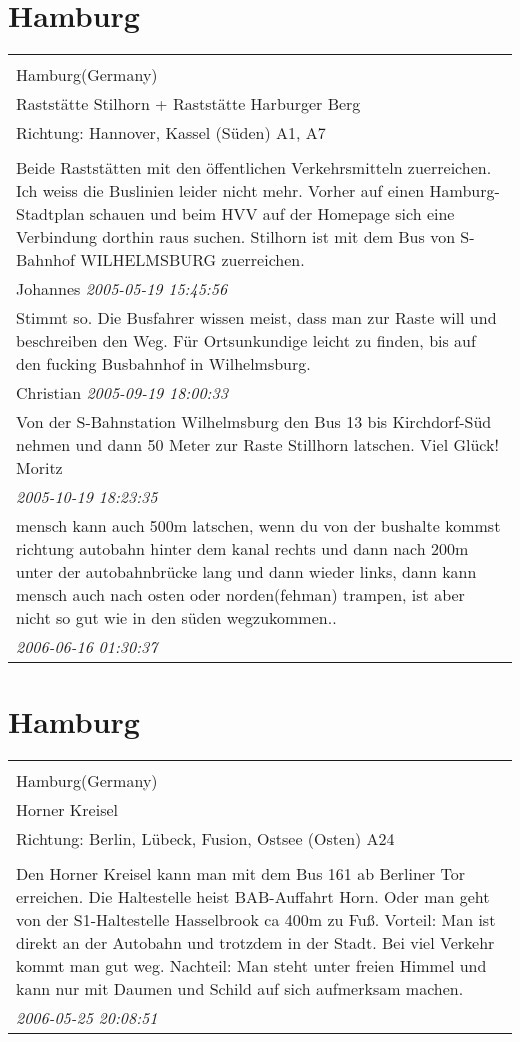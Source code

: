 \documentclass[a4paper,12pt]{article}
\begin{document}
\section{Hamburg}
\begin{tabular}{|p{13cm}|}
\hline\\
Hamburg(Germany)\\
Raststätte Stilhorn + Raststätte Harburger Berg\\
Richtung: Hannover, Kassel (Süden) A1, A7 \\
\hline\\
Beide Raststätten mit den öffentlichen Verkehrsmitteln zuerreichen. Ich weiss die Buslinien leider nicht mehr. Vorher auf einen Hamburg-Stadtplan schauen und beim HVV auf der Homepage sich eine Verbindung dorthin raus suchen.
Stilhorn ist mit dem Bus von S-Bahnhof WILHELMSBURG zuerreichen. \\
Johannes \textit{ 2005-05-19 15:45:56 }\\\hline Stimmt so. Die Busfahrer wissen meist, dass man zur Raste will und beschreiben den Weg. Für Ortsunkundige leicht zu finden, bis auf den fucking Busbahnhof in Wilhelmsburg. \\
Christian \textit{ 2005-09-19 18:00:33 }\\\hline Von der S-Bahnstation Wilhelmsburg den Bus 13 bis Kirchdorf-Süd nehmen und dann 50 Meter zur Raste Stillhorn latschen. Viel Glück!
Moritz \\
\textit{ 2005-10-19 18:23:35 }\\\hline mensch kann auch 500m latschen, wenn du von der bushalte kommst richtung autobahn hinter dem kanal rechts und dann nach 200m unter der autobahnbrücke lang und dann wieder links, dann kann mensch auch nach osten oder norden(fehman) trampen, ist aber nicht so gut wie in den süden wegzukommen.. \\
\textit{ 2006-06-16 01:30:37 }\\\hline
\end{tabular}


\section{Hamburg}
\begin{tabular}{|p{13cm}|}
\hline\\
Hamburg(Germany)\\
Horner Kreisel\\
Richtung: Berlin, Lübeck, Fusion, Ostsee (Osten) A24 \\
\hline\\
Den Horner Kreisel kann man mit dem Bus 161 ab Berliner Tor erreichen. Die Haltestelle heist BAB-Auffahrt Horn.
Oder man geht von der S1-Haltestelle Hasselbrook ca 400m zu Fuß.
Vorteil: Man ist direkt an der Autobahn und trotzdem in der Stadt. Bei viel Verkehr kommt man gut weg.
Nachteil: Man steht unter freien Himmel und kann nur mit Daumen und Schild auf sich aufmerksam machen. \\
\textit{ 2006-05-25 20:08:51 }\\\hline
\end{tabular}
\end{document}
